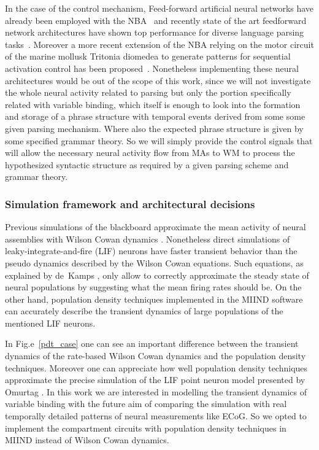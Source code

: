 \documentclass[10pt]{article}
\begin{document}
In the case of the control mechanism, Feed-forward artificial neural
networks have already been employed with the
NBA~\cite{van_der_Velde_2010} and recently state of the art
feedforward network architectures have shown top performance for
diverse language parsing tasks~\cite{Andor_2016}. Moreover a more
recent extension of the NBA relying on the motor circuit of the marine
mollusk Tritonia diomedea to generate patterns for sequential
activation control has been proposed~\cite{van_Dijk_2015}. Nonetheless
implementing these neural architectures would be out of the scope of
this work, since we will not investigate the whole neural activity
related to parsing but only the portion specifically related with
variable binding, which itself is enough to look into the formation
and storage of a phrase structure with temporal events derived from
some some given parsing mechanism. Where also the expected phrase
structure is given by some specified grammar theory. So we will simply
provide the control signals that will allow the necessary neural
activity flow from MAs to WM to process the hypothesized syntactic
structure as required by a given parsing scheme and grammar theory.

\subsubsection{Simulation framework and architectural
  decisions}\label{simulation-framework-and-architectural-decisions}

Previous simulations of the blackboard approximate the mean activity
of neural assemblies with Wilson Cowan dynamics \cite{Frank_2014}.
Nonetheless direct simulations of leaky-integrate-and-fire (LIF)
neurons \cite{omurtag2000simulation} have faster transient behavior
than the pseudo dynamics described by the Wilson Cowan equations. Such
equations, as explained by de~Kamps \cite{de_Kamps_2008}, only allow
to correctly approximate  the steady state of neural populations by
suggesting what the mean firing rates should be. On the other hand,
population density techniques \cite{de2013generic} implemented in the
MIIND software \cite{de_Kamps_2008} \cite{harrison2011new} can
accurately describe the transient dynamics of large populations of the
mentioned LIF neurons.

In Fig.e~\ref{pdt_case} one can see an important difference between
the transient dynamics of the rate-based Wilson Cowan dynamics and the
population density techniques. Moreover one can appreciate how well
population density techniques approximate the precise simulation of
the LIF point neuron model presented by Omurtag
\cite{omurtag2000simulation}. In this work we are interested in
modelling the transient dynamics of variable binding with the future
aim of comparing the simulation with real temporally detailed patterns
of neural measurements like ECoG. So we opted to implement the
compartment circuits with population density techniques in MIIND
instead of Wilson Cowan dynamics.
\end{document}
